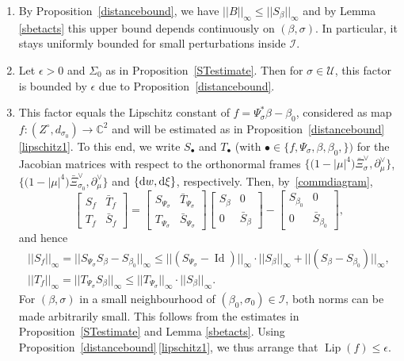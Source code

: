 \documentclass[10pt,a4paper]{amsart}
\numberwithin{equation}{section}
\theoremstyle{definition}
\newcommand{\C}{\mathbb{C}} %
\newcommand{\1}{{\bf 1}}
\newcommand{\Id}{\operatorname{Id}}
\DeclareMathOperator{\Lip}{Lip}
\begin{document}
\begin{enumerate}[label=\rm(\alph*)]\itemsep=0pt
	\item By Proposition~\ref{distancebound}, we have $||B||_\infty \le || S_\beta ||_\infty$ and by Lemma \ref{sbetacts} this upper bound depends continuously on $(\beta,\sigma)$. In particular, it stays uniformly bounded for small perturbations inside $\mathcal I$.
	
	\item Let $\epsilon>0$ and $\Sigma_0$ as in Proposition~\ref{STestimate}. Then for $\sigma\in \mathcal U$, this factor is bounded by $\epsilon$ due to Proposition~\ref{distancebound}.
	
	
	\item This factor equals the Lipschitz constant of $f=\Psi_\sigma^*\beta- \beta_0$, considered as map $f\colon (Z^\circ, d_{\sigma_0})\rightarrow \C^2$ and will be estimated as in Proposition~\ref{distancebound}\,\ref{lipschitz1}. To this end, we write $S_\bullet$ and $T_\bullet$ (with $\bullet \in \{f,\Psi_\sigma,\beta,\beta_0, \})$ for the Jacobian matrices with respect to the orthonormal frames
$\big\{\bigl(1-|\mu|^4\bigr)\bar{\Xi}^\vee_\sigma,\partial_\mu^\vee\big\}$, $ \big\{\bigl(1-|\mu|^4\bigr)\bar{\Xi}^\vee_{\sigma_0},\partial_\mu^\vee\big\}$ and $\{{\rm d}w,{\rm d}\xi\}$,
 respectively. Then, by~\eqref{commdiagram},
\[
	\begin{bmatrix}
		S_f & \bar T_f\\
		T_f & \bar S_f
	\end{bmatrix}
	=
	\begin{bmatrix}
		S_{\Psi_\sigma} & \bar T_{\Psi_\sigma}\\
		T_{\Psi_\sigma} & \bar S_{\Psi_\sigma}
	\end{bmatrix}
	\begin{bmatrix}
		S_\beta & 0\\
		0 & \bar S_\beta
	\end{bmatrix}
	-
	\begin{bmatrix}
		S_{\beta_0} & 0\\
		0 & \bar S_{\beta_0}
	\end{bmatrix},
\]
and hence
\begin{gather*}
	|| S_f ||_\infty = || S_{\Psi_\sigma}S_\beta - S_{\beta_0}||_\infty \le || (S_{\Psi_\sigma}-\Id) ||_\infty\cdot ||S_\beta||_\infty + ||(S_\beta - S_{\beta_0})||_\infty,\\
	||T_f||_\infty =|| T_{\Psi_\sigma}S_\beta||_\infty \le ||T_{\Psi_\sigma} ||_\infty \cdot || S_\beta||_\infty.
\end{gather*}
For $(\beta,\sigma)$ in a small neighbourhood of $(\beta_0,\sigma_0)\in \mathcal I$, both norms can be made arbitrarily small. This follows from the estimates in Proposition~\ref{STestimate} and Lemma \ref{sbetacts}. Using Proposition~\ref{distancebound}\,\ref{lipschitz1}, we thus arrange that $\Lip (f) \le \epsilon $.
\end{enumerate}
\end{document}
